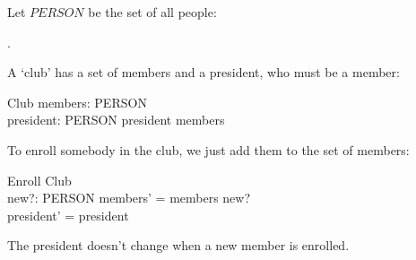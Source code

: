
Let $PERSON$ be the set of all people:
\begin{zed}
	[PERSON].
\end{zed}
A `club' has a set of members and a president, who must be a member:
\begin{schema}{Club}
	members: \power PERSON \\
	president: PERSON
\where
	president \subseteq members
\end{schema}
To enroll somebody in the club, we just add them to the set of
members:
\begin{schema}{Enroll}
	\Delta Club \\
	new?: PERSON
\where
	members' = members \cup new? \\
	president' = president
\end{schema}
The president doesn't change when a new member is enrolled.

